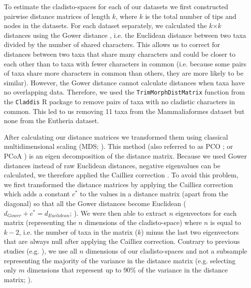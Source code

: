 \documentclass[12pt,letterpaper]{article}
\renewcommand{\subsubsection}[1]{%
\vspace{2ex}
\noindent
\textit{#1.}---}
\begin{document}
To estimate the cladisto-spaces for each of our datasets we first constructed pairwise distance matrices of length $k$, where $k$ is the total number of tips and nodes in the datasets.
For each dataset separately, we calculated the $k$$\times$$k$ distances using the Gower distance \cite{Gower71}, i.e. the Euclidean distance between two taxa divided by the number of shared characters. 
This allows us to correct for distances between two taxa that share many characters and could be closer to each other than to taxa with fewer characters in common (i.e. because some pairs of taxa share more characters in common than others, they are more likely to be similar).
However, the Gower distance cannot calculate distances when taxa have no overlapping data.
Therefore, we used the \texttt{TrimMorphDistMatrix} function from the \texttt{Claddis} R package \cite{Claddis} to remove pairs of taxa with no cladistic characters in common.
This led to us removing 11 taxa from the Mammaliaformes dataset but none from the Eutheria dataset.

After calculating our distance matrices we transformed them using classical multidimensional scaling (MDS; \cite{torgerson1965multidimensional,GOWER01121966,cailliez1983analytical}).
This method (also referred to as PCO \cite{Brusatte2015}; or PCoA \cite{paradisape:2004}) is an eigen decomposition of the distance matrix.
Because we used Gower distances instead of raw Euclidean distances, negative eigenvalues can be calculated, we therefore applied the Cailliez correction \cite{cailliez1983analytical}.
To avoid this problem, we first transformed the distance matrices by applying the Cailliez correction \cite{cailliez1983analytical} which adds a constant $c^*$ to the values in a distance matrix (apart from the diagonal) so that all the Gower distances become Euclidean ($d_{Gower}+c^*=d_{Euclidean}$; \cite{cailliez1983analytical}).
We were then able to extract $n$ eigenvectors for each matrix (representing the $n$ dimensions of the cladisto-space) where $n$ is equal to $k-2$, i.e. the number of taxa in the matrix ($k$) minus the last two eigenvectors that are always null after applying the Cailliez correction.
Contrary to previous studies (e.g. \cite{brusatte50,anderson2012using}), we use all $n$ dimensions of our cladisto-spaces and not a subsample representing the majority of the variance in the distance matrix (e.g. selecting only $m$ dimensions that represent up to 90\% of the variance in the distance matrix; \cite{Brusatte12092008,toljagictriassic-jurassic2013}).
\end{document}
